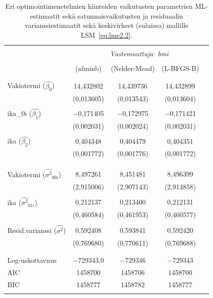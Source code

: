 \documentclass[finnish]{docopts}
\begin{document}
\begin{table}[H] \centering 
\begin{tabular}{@{\extracolsep{5pt}}lcccc} 
\\[-1.8ex]\hline 
\hline \\[-1.8ex] 
 & \multicolumn{4}{c}{\textit{Vastemuuttuja: bmi}} \\ 
\\[-1.8ex] & (nlminb) & (Nelder-Mead) & (L-BFGS-B)\\ 
\hline \\[-1.8ex] 
  & & & & \\ 
 Vakiotermi ($\hat{\beta_0}$) & 14,432802 & 14,439736 & 14,432899\\ 
  & (0,013605) & (0,013543) & (0,013604)\\ 
  & & &\\ 
 ika\_0i ($\hat{\beta_1}$) & $-$0,171405 & $-$0,172975 & $-$0,171421\\ 
  & (0,002031) & (0,002024) & (0,002031)\\ 
  & & & & \\ 
 ika ($\hat{\beta_2}$) & 0,404348 & 0,404479 & 0,404351\\ 
  & (0,001772) & (0,001776) & (0,001772)\\ 
  & & & & \\ 
\hline \\[-1.8ex] 
  & & &\\ 
Vakiotermi ($\hat{\sigma^2}_{b0i}$) & 8,497261 & 8,451481 & 8,496399\\
  & (2,915006) & (2,907143) & (2,914858)\\
    & & &\\ 
ika ($\hat{\sigma^2}_{b1i}$) & 0,212137 & 0,213400 & 0,212131\\
  & (0,460584) & (0,461953) & (0,460577)\\ 
    & & &\\ 
Resid.varianssi ($\hat{\sigma^2}$) & 0,592408 & 0,593841 & 0,592420\\
  & (0,769680) & (0,770611) & (0,769688)\\ 
  & & &\\ 
\hline \\[-1.8ex] 
Log-uskottavuus & $-$729343,0 & $-$729346 & $-$729343\\ 
AIC & 1458700 & 1458706 & 1458700\\ 
BIC & 1458777 & 1458782 & 1458777\\ 
\hline 
\hline \\[-1.8ex] 
\end{tabular}
\caption{Eri optimointimenetelmien kiinteiden vaikutusten parametrien ML-estimaatit sekä satunnaisvaikutusten ja residuaalin varianssiestimaatit sekä keskivirheet (suluissa) mallille LSM~\ref{eq:lme2.2}.}
\label{table:optims}
\end{table} 
\end{document}
